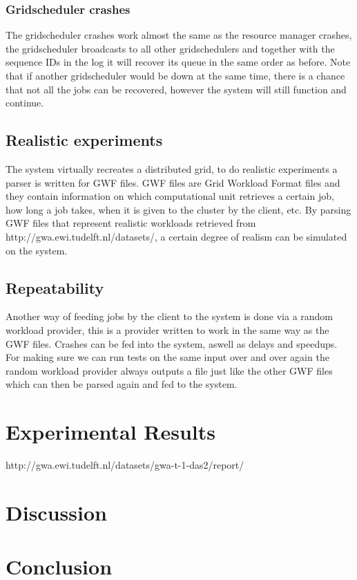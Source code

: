 \documentclass[a4paper]{article}
\begin{document}
\subsubsection{Gridscheduler crashes}
The gridscheduler crashes work almost the same as the resource manager crashes, the gridscheduler broadcasts to all other gridschedulers and together with the sequence IDs in the log it will recover its queue in the same order as before.
Note that if another gridscheduler would be down at the same time, there is a chance that not all the jobs can be recovered, however the system will still function and continue.

\subsection{Realistic experiments}
The system virtually recreates a distributed grid, to do realistic experiments a parser is written for GWF files. 
GWF files are Grid Workload Format files and they contain information on which computational unit retrieves a certain job, how long a job takes, when it is given to the cluster by the client, etc.
By parsing GWF files that represent realistic workloads retrieved from http://gwa.ewi.tudelft.nl/datasets/, a certain degree of realism can be simulated on the system.

\subsection{Repeatability}
Another way of feeding jobs by the client to the system is done via a random workload provider, this is a provider written to work in the same way as the GWF files.
Crashes can be fed into the system, aswell as delays and speedups.
For making sure we can run tests on the same input over and over again the random workload provider always outputs a file just like the other GWF files which can then be parsed again and fed to the system.


\section{Experimental Results}
http://gwa.ewi.tudelft.nl/datasets/gwa-t-1-das2/report/

\section{Discussion}

\section{Conclusion}




\end{document}
